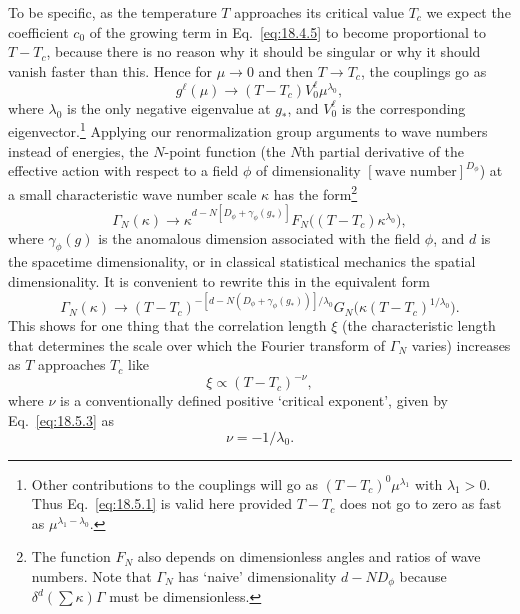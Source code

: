 To be specific, as the temperature $T$ approaches its critical value $T_c$ we expect the coefficient $c_0$ of the growing term in Eq.~\eqref{eq:18.4.5} to become proportional to $T-T_c$, because there is no reason why it should be singular or why it should vanish faster than this. Hence for $\mu\to0$ and then $T\to T_c$, the couplings go as
\begin{equation}
g^\ell(\mu)\to(T-T_c)V_0^\ell\mu^{\lambda_0},
\tag{18.5.1}\label{eq:18.5.1}
\end{equation}
where $\lambda_0$ is the only negative eigenvalue at $g_*$, and $V_0^\ell$ is the corresponding eigenvector.\footnote{Other contributions to the couplings will go as $(T-T_c)^0\mu^{\lambda_1}$ with $\lambda_1>0$. Thus Eq.~\eqref{eq:18.5.1} is valid here provided $T-T_c$ does not go to zero as fast as $\mu^{\lambda_1-\lambda_0}$.} Applying our renormalization group arguments to wave numbers instead of energies, the $N$-point function (the $N$th partial derivative of the effective action with respect to a field $\phi$ of dimensionality $[\text{wave number}]^{D_\phi}$) at a small characteristic wave number scale $\kappa$ has the form\footnote{The function $F_N$ also depends on dimensionless angles and ratios of wave numbers. Note that $\Gamma_N$ has `naive' dimensionality $d-ND_\phi$ because $\delta^d(\sum\kappa)\Gamma$ must be dimensionless.}
\begin{equation}
\Gamma_N(\kappa)\to\kappa^{d-N[D_\phi+\gamma_\phi(g_*)]}
F_N\bigl((T-T_c)\kappa^{\lambda_0}\bigr),
\tag{18.5.2}\label{eq:18.5.2}
\end{equation}
where $\gamma_\phi(g)$ is the anomalous dimension associated with the field $\phi$, and $d$ is the spacetime dimensionality, or in classical statistical mechanics the spatial dimensionality. It is convenient to rewrite this in the equivalent form
\begin{equation}
\Gamma_N(\kappa)\to(T-T_c)^{-[d-N(D_\phi+\gamma_\phi(g_*))]/\lambda_0}
G_N\bigl(\kappa(T-T_c)^{1/\lambda_0}\bigr).
\tag{18.5.3}\label{eq:18.5.3}
\end{equation}
This shows for one thing that the correlation length $\xi$ (the characteristic length that determines the scale over which the Fourier transform of $\Gamma_N$ varies) increases as $T$ approaches $T_c$ like
\begin{equation}
\xi\propto(T-T_c)^{-\nu},
\tag{18.5.4}\label{eq:18.5.4}
\end{equation}
where $\nu$ is a conventionally defined positive `critical exponent', given by Eq.~\eqref{eq:18.5.3} as
\begin{equation}
\nu=-1/\lambda_0.
\tag{18.5.5}\label{eq:18.5.5}
\end{equation}

